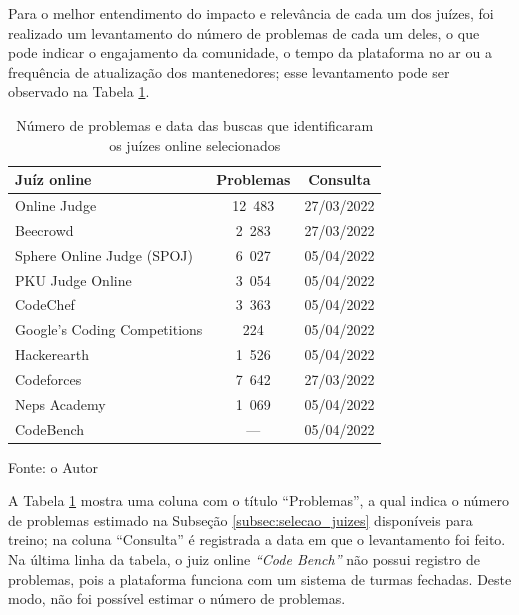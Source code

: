 Para o melhor entendimento do impacto e relevância de cada um dos juízes, foi realizado um levantamento do número de problemas de cada um deles, o que pode indicar o engajamento da comunidade, o tempo da plataforma no ar ou a frequência de atualização dos mantenedores; esse levantamento pode ser observado na Tabela \ref{table:detalhes_juizes}. 

\begin{table}[h]
\centering
\begin{threeparttable}
    \caption{Número de problemas e data das buscas que identificaram os juízes online selecionados}
    
    \label{table:detalhes_juizes}
    \begin{tabular}{lcc}
        \toprule
        \textbf{Juíz online}         & \textbf{Problemas} & \textbf{Consulta} \\
        \midrule
        Online Judge                 & 12 483              & 27/03/2022        \\
        Beecrowd                     & 2 283               & 27/03/2022        \\
        Sphere Online Judge (SPOJ)   & 6 027               & 05/04/2022        \\
        PKU Judge Online             & 3 054               & 05/04/2022        \\
        CodeChef                     & 3 363               & 05/04/2022        \\
        Google's Coding Competitions & 224                & 05/04/2022        \\
        Hackerearth                  & 1 526               & 05/04/2022        \\
        Codeforces                   & 7 642               & 27/03/2022        \\
        Neps Academy                 & 1 069               & 05/04/2022        \\
        CodeBench                    & —                  & 05/04/2022   \\
        \bottomrule
    \end{tabular}
    \medskip
    \begin{tablenotes}
        \centering
        \item Fonte: o Autor
    \end{tablenotes}
\end{threeparttable}
\end{table}

A Tabela \ref{table:detalhes_juizes} mostra uma coluna com o título “Problemas”, a qual indica o número de problemas estimado na Subseção \ref{subsec:selecao_juizes} disponíveis para treino; na coluna ``Consulta'' é registrada a data em que o levantamento foi feito. Na última linha da tabela, o juiz online \textit{“Code Bench”} não possui registro de problemas, pois a plataforma funciona com um sistema de turmas fechadas. Deste modo, não foi possível estimar o número de problemas.

